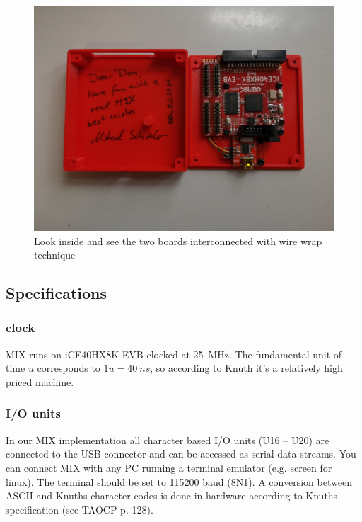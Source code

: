 \documentclass[a4paper,ngerman]{scrartcl}
\begin{document}
\begin{figure}[H]
	\centering
	\includegraphics[width=0.7\linewidth]{../MIX_don.jpg}
	\caption{Look inside and see the two boards interconnected with wire wrap technique}
	\label{fig:mixinside}
\end{figure}


\subsection{Specifications}

\subsubsection{clock}
MIX runs on iCE40HX8K-EVB clocked at \SI{25}{MHz}. The fundamental unit of time $u$ corresponds to $1u = \SI{40}{ns}$, so according to Knuth it's a relatively high priced machine.

\subsubsection{I/O units}
In our MIX implementation all character based I/O units (U16 -- U20) are connected to the USB-connector and can be accessed as serial data streams. You can connect MIX with any PC running a terminal emulator (e.g. screen for linux). The terminal should be set to 115200 baud (8N1). A conversion between ASCII and Knuths character codes is done in hardware according to Knuths specification (see TAOCP p. 128).
\end{document}
